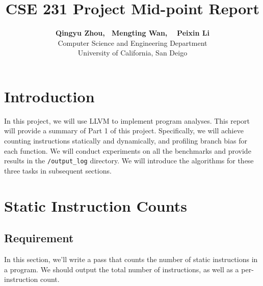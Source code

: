 \documentclass{acm_proc_article-sp}
\begin{document}
\title{CSE 231 Project Mid-point Report}

\author{
\alignauthor
{\Large \bf Qingyu Zhou\footnotemark[1],~ Mengting Wan\footnotemark[2], ~ Peixin Li\footnotemark[3]}\\
\vspace{0.1in}
Computer Science and Engineering Department \\
University of California, San Deigo \\
\vspace{0.1in}
}


\maketitle





\section{Introduction}
In this project, we will use LLVM to implement program analyses. This report will provide a summary of Part 1 of this project. Specifically, we will achieve counting instructions statically and dynamically, and profiling branch bias for each function. We will conduct experiments on all the benchmarks and provide results in the {\tt /output\_log} directory. We will introduce the algorithms for these three tasks in subsequent sections.

\section{Static Instruction Counts}

\subsection{Requirement}
In this section, we'll write a pass that counts the number of static instructions in a program. We should output the total number of instructions, as well as a per-instruction count.
\end{document}
